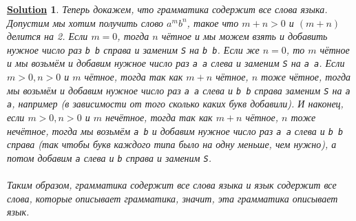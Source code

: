 \documentclass[12pt]{article}
\theoremstyle{nonumberplain}
\newtheorem{solution}{\underline{\textbf{Solution}}}
\begin{document}
\begin{enumerate}
\begin{solution}
 		Теперь докажем, что грамматика содержит все слова языка. Допустим мы хотим получить слово $a^m b^n$, такое что $m + n > 0$ и $(m + n)$ делится на 2. Если $m = 0$, тогда $n$ чётное и мы можем взять и добавить нужное число раз \texttt{b b} справа и заменим \texttt{S} на \texttt{b b}. Если же $n = 0$, то $m$ чётное и мы возьмём и добавим нужное число раз \texttt{a a} слева и заменим \texttt{S} на \texttt{a a}. Если $m > 0, n > 0$ и $m$ чётное, тогда так как $m + n$ чётное, $n$ тоже чётное, тогда мы возьмём и добавим нужное число раз \texttt{a a} слева и \texttt{b b} справа заменим \texttt{S} на \texttt{a a}, например (в зависимости от того сколько каких букв добавили). И наконец, если $m > 0, n > 0$ и $m$ нечётное, тогда так как $m + n$ чётное, $n$ тоже нечётное, тогда мы возьмём \texttt{a b} и добавим нужное число раз \texttt{a a} слева и \texttt{b b} справа (так чтобы букв каждого типа было на одну меньше, чем нужно), а потом добавим \texttt{a} слева и \texttt{b} справа и заменим \texttt{S}.\\\\
 		Таким образом, грамматика содержит все слова языка и язык содержит все слова, которые описывает грамматика, значит, эта грамматика описывает язык.
	\end{solution}
\end{enumerate}
\end{document}
